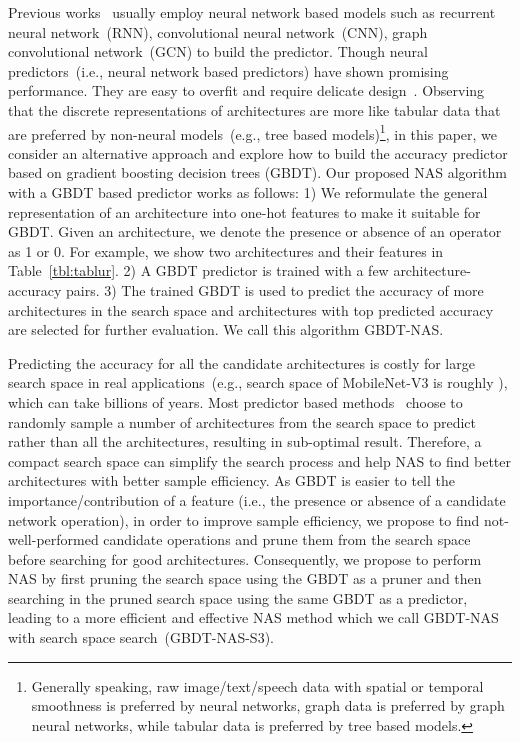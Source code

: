 \documentclass{article}
\begin{document}
Previous works~\cite{perfpred,PNAS,nao,neuralpredictor} usually employ neural network based models such as recurrent neural network~(RNN), convolutional neural network~(CNN), graph convolutional network~(GCN) to build the predictor. Though neural predictors~(i.e., neural network based predictors) have shown promising performance. They are easy to overfit and require delicate design~\cite{nao,neuralpredictor,npenas}. Observing that the discrete representations of architectures are more like tabular data that are preferred by non-neural models~(e.g., tree based models)\footnote{Generally speaking, raw image/text/speech data with spatial or temporal smoothness is preferred by neural networks, graph data is preferred by graph neural networks, while tabular data is preferred by tree based models.},
in this paper, we consider an alternative approach and explore how to build the accuracy predictor based on gradient boosting decision trees (GBDT). Our proposed NAS algorithm with a GBDT based predictor works as follows: 1) We reformulate the general representation of an architecture into one-hot features to make it suitable for GBDT. Given an architecture, we denote the presence or absence of an operator as 1 or 0. For example, we show two architectures and their features in Table~\ref{tbl:tablur}. 2) A GBDT predictor is trained with a few architecture-accuracy pairs. 3) The trained GBDT is used to predict the accuracy of more architectures in the search space and architectures with top predicted accuracy are selected for further evaluation. We call this algorithm GBDT-NAS.

Predicting the accuracy for all the candidate architectures is costly for large search space in real applications~(e.g., search space of MobileNet-V3 is roughly ), which can take billions of years. Most predictor based methods~\cite{neuralpredictor} choose to randomly sample a number of architectures from the search space to predict rather than all the architectures, resulting in sub-optimal result. Therefore, a compact search space can simplify the search process and help NAS to find better architectures with better sample efficiency. As GBDT is easier to tell the importance/contribution of a feature (i.e., the presence or absence of a candidate network operation), in order to improve sample efficiency, we propose to find not-well-performed candidate operations and prune them from the search space before searching for good architectures. Consequently, we propose to perform NAS by first pruning the search space using the GBDT as a pruner and then searching in the pruned search space using the same GBDT as a predictor, leading to a more efficient and effective NAS method which we call GBDT-NAS with search space search~(GBDT-NAS-S3).
\end{document}
